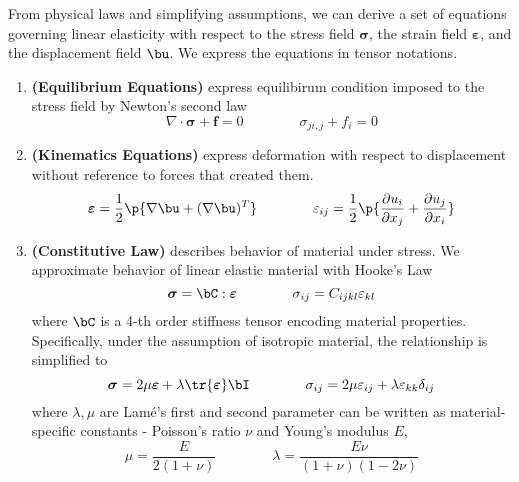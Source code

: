\documentclass[11pt]{article}
\newcommand{\bheading}[1]{\textbf{(#1)}}
\newcommand{\bsigma}{\boldsymbol{\sigma}}
\newcommand{\bepsilon}{\boldsymbol{\varepsilon}}
\renewcommand{\epsilon}{\varepsilon}
\renewcommand{\bf}{\mathbf{f}}
\begin{document}
From physical laws and simplifying assumptions, we can derive a set of equations governing linear elasticity with respect to the stress field $\bsigma$, the strain field $\bepsilon$, and the displacement field $\bu$. We express the equations in tensor notations.
\begin{enumerate}
    \item \bheading{Equilibrium Equations} express equilibirum condition imposed to the stress field by Newton's second law
    \[
        \nabla\cdot\bsigma + \bf = 0
        \quad\quad\quad\quad
        \sigma_{ji,j} + f_i = 0
    \]
    \item \bheading{Kinematics Equations} express deformation with respect to displacement without reference to forces that created them. 
    \[
        \bepsilon = \dfrac{1}{2} \p{
            \nabla \bu + (\nabla\bu)^T
        }
        \quad\quad\quad\quad
        \epsilon_{ij} = 
            \frac{1}{2} \p{
                \frac{\partial u_i}{\partial x_j} + \frac{\partial u_j}{\partial x_i}}
    \]
    \item \bheading{Constitutive Law} describes behavior of material under stress. We approximate behavior of linear elastic material with Hooke's Law
    \[
        \bsigma = \bC : \bepsilon
        \quad\quad\quad\quad
        \sigma_{ij} = C_{ijkl} \epsilon_{kl}
    \]
    where $\bC$ is a 4-th order stiffness tensor encoding material properties. Specifically, under the assumption of isotropic material, the relationship is simplified to 
    \[
        \bsigma = 2\mu\bepsilon + \lambda \tr{\bepsilon} \bI
        \quad\quad\quad\quad
        \sigma_{ij} = 2\mu \epsilon_{ij} + \lambda \epsilon_{kk} \delta_{ij}
    \]
    where $\lambda,\mu$ are Lam\'{e}'s first and second parameter can be written as material-specific constants - Poisson's ratio $\nu$ and Young's modulus $E$,
    \[
        \mu = \frac{E}{2(1+\nu)}
        \quad\quad\quad\quad
        \lambda = \frac{E\nu}{(1+\nu)(1-2\nu)}
    \]
\end{enumerate}
\end{document}
